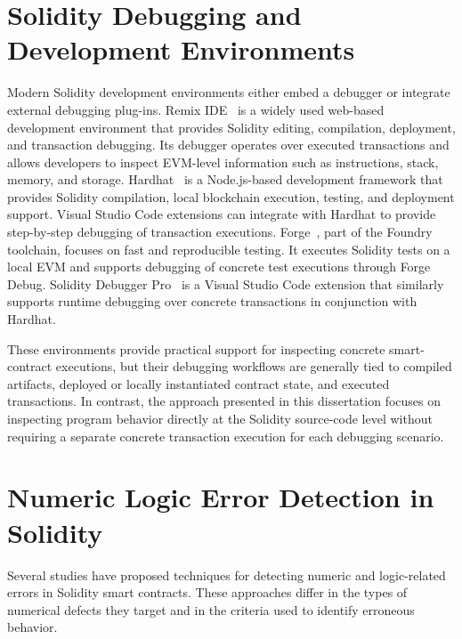 \documentclass[11pt,oneside]{report}
\theoremstyle{plain}
\theoremstyle{definition}
\theoremstyle{remark}
\begin{document}
\section{Solidity Debugging and Development Environments}
\label{sec:rel:debugging}
Modern Solidity development environments either embed a debugger or integrate external debugging plug-ins. 
Remix IDE~\citep{remix} is a widely used web-based development environment that provides Solidity editing, compilation, deployment, and transaction debugging. Its debugger operates over executed transactions and allows developers to inspect EVM-level information such as instructions, stack, memory, and storage.
Hardhat~\citep{hardhat} is a Node.js-based development framework that provides Solidity compilation, local blockchain execution, testing, and deployment support. Visual Studio Code extensions can integrate with Hardhat to provide step-by-step debugging of transaction executions. 
Forge~\citep{forge}, part of the Foundry toolchain, focuses on fast and reproducible testing. It executes Solidity tests on a local EVM and supports debugging of concrete test executions through Forge Debug. 
Solidity Debugger Pro~\citep{soldepro} is a Visual Studio Code extension that similarly supports runtime debugging over concrete transactions in conjunction with Hardhat.

These environments provide practical support for inspecting concrete smart-contract executions, but their debugging workflows are generally tied to compiled artifacts, deployed or locally instantiated contract state, and executed transactions. In contrast, the approach presented in this dissertation focuses on inspecting program behavior directly at the Solidity source-code level without requiring a separate concrete transaction execution for each debugging scenario.

\section{Numeric Logic Error Detection in Solidity}
\label{sec:rel:nle}
Several studies have proposed techniques for detecting numeric and logic-related errors in Solidity smart contracts.
These approaches differ in the types of numerical defects they target and in the criteria used to identify erroneous behavior.
\end{document}
